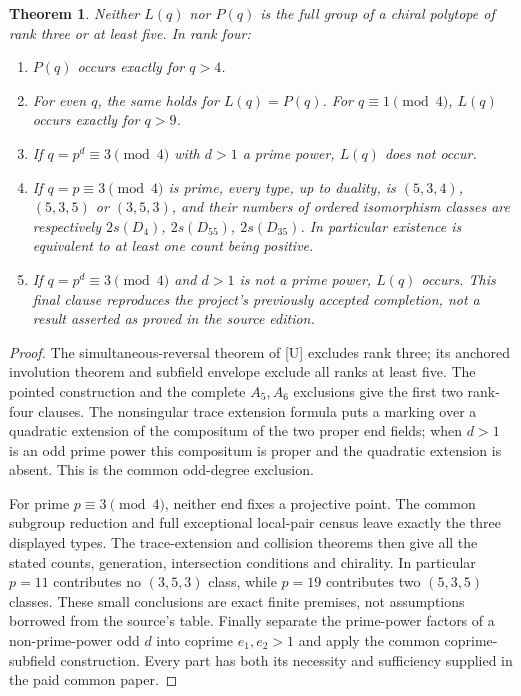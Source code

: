 \documentclass[11pt,a4paper]{article}
\newtheorem{theorem}{Theorem}\newtheorem{proposition}[theorem]{Proposition}
\begin{document}
\begin{theorem}\label{app:classification}
Neither $L(q)$ nor $P(q)$ is the full group of a chiral polytope of
rank three or at least five. In rank four:
\begin{enumerate}
\item $P(q)$ occurs exactly for $q>4$.
\item For even $q$, the same holds for $L(q)=P(q)$.
For $q\equiv1\pmod4$, $L(q)$ occurs exactly for $q>9$.
\item If $q=p^d\equiv3\pmod4$ with $d>1$ a prime power, $L(q)$ does not occur.
\item If $q=p\equiv3\pmod4$ is prime, every type, up to duality,
is $(5,3,4)$, $(5,3,5)$ or $(3,5,3)$, and their numbers of ordered
isomorphism classes are respectively $2s(D_4)$, $2s(D_{55})$, $2s(D_{35})$.
In particular existence is equivalent to at least one count being positive.
\item If $q=p^d\equiv3\pmod4$ and $d>1$ is not a prime power, $L(q)$ occurs.
This final clause reproduces the project's previously accepted completion,
not a result asserted as proved in the source edition.
\end{enumerate}
\end{theorem}
\begin{proof}
The simultaneous-reversal theorem of [U] excludes rank three; its anchored
involution theorem and subfield envelope exclude all ranks at least five.
The pointed construction and the complete $A_5,A_6$ exclusions give the
first two rank-four clauses. The nonsingular trace extension formula
puts a marking over a quadratic extension of the compositum of the two
proper end fields; when $d>1$ is an odd prime power this compositum is
proper and the quadratic extension is absent. This is the common
odd-degree exclusion.

For prime $p\equiv3\pmod4$, neither end fixes a projective point.
The common subgroup reduction and full exceptional local-pair census
leave exactly the three displayed types. The trace-extension and
collision theorems then give all the stated counts, generation,
intersection conditions and chirality. In particular $p=11$ contributes
no $(3,5,3)$ class, while $p=19$ contributes two $(5,3,5)$ classes.
These small conclusions are exact finite premises, not assumptions
borrowed from the source's table. Finally separate the prime-power
factors of a non-prime-power odd $d$ into coprime $e_1,e_2>1$ and apply
the common coprime-subfield construction. Every part has both its
necessity and sufficiency supplied in the paid common paper.
\end{proof}
\end{document}

